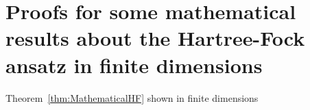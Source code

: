 \chapter{Proofs for some mathematical results about the Hartree-Fock ansatz in finite dimensions}
\label{apx:HFTheoremFinite}

Theorem~\vref{thm:MathematicalHF} shown in finite dimensions

